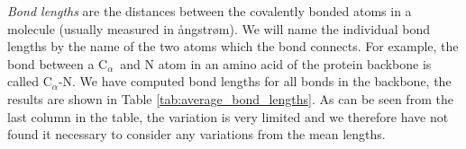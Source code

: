 \documentclass[a0,portrait]{a0poster}
\newcommand{\Ca}{C$_{\alpha}${}}
\begin{document}
\begin{GridBlock}{0}{75}{48}

\textit{Bond lengths} are the distances between the covalently bonded atoms
in a molecule (usually measured in ångstrøm). We will name the
individual bond lengths by the name of the two atoms which the bond
connects. For example, the bond between a \Ca\ and N atom in an amino acid of
the protein backbone is called \Ca -N. We have computed bond lengths
for all bonds in the backbone, the results are shown in Table
\ref{tab:average_bond_lengths}. As can be seen from the last column in
the table, the variation is very limited and we therefore have not
found it necessary to consider any variations from the mean
lengths.
\end{GridBlock}

\begin{GridBlock}{51}{75}{48}
\begin{multicols}{2}
\vspace{-4mm}
\end{multicols}
\end{GridBlock}
\end{document}

